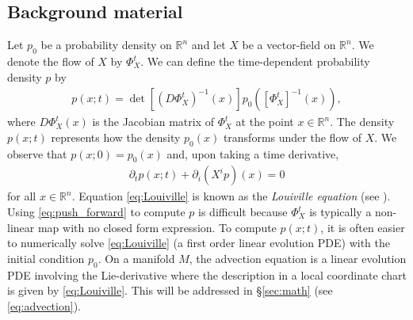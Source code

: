 \documentclass[a4paper, 12 pt]{amsart}
\newcommand{\R}{\mathbb{R}}
\begin{document}
\subsection{Background material}
  Let $p_0$ be a probability density on $\R^n$
  and let $X$ be a vector-field on $\R^n$.
  We denote the flow of $X$
  by $\Phi_X^t$.
  We can define the time-dependent probability
  density $p$ by
  \begin{align}
    p( x ; t) = 
     \det\left[ (D\Phi_X^t)^{-1}(x) \right] p_0\left( \left[\Phi_X^t\right]^{-1}(x) \right), \label{eq:push_forward}
  \end{align}
  where $D\Phi_X^t(x)$ is the Jacobian matrix of
  $\Phi_X^t$ at the point $x \in \R^n$.
  The density $p(x;t)$ represents how the density
  $p_0(x)$ transforms under the flow of $X$.
  We observe that $p(x;0) = p_0(x)$ and, upon taking
  a time derivative,
  \begin{align}
    \partial_t p (x;t) + \partial_i (X^i p)(x) = 0 \label{eq:Louiville}
  \end{align}
  for all $x \in \R^n$.
  Equation \eqref{eq:Louiville} is known as the \emph{Louiville equation} (see \cite{LasotaMackey1994}).
  Using \eqref{eq:push_forward} to compute $p$ is difficult
  because $\Phi_X^t$ is typically a non-linear map with no closed
  form expression.
  To compute $p( x ; t)$, it is often easier
  to numerically solve \eqref{eq:Louiville}
  (a first order linear evolution PDE)
  with the initial condition $p_0$.
  On a manifold $M$, the advection equation is a linear
  evolution PDE involving the Lie-derivative
  where the description in a local coordinate chart is
  given by \eqref{eq:Louiville}.
  This will be addressed in \S \ref{sec:math} (see \eqref{eq:advection}).
\end{document}
